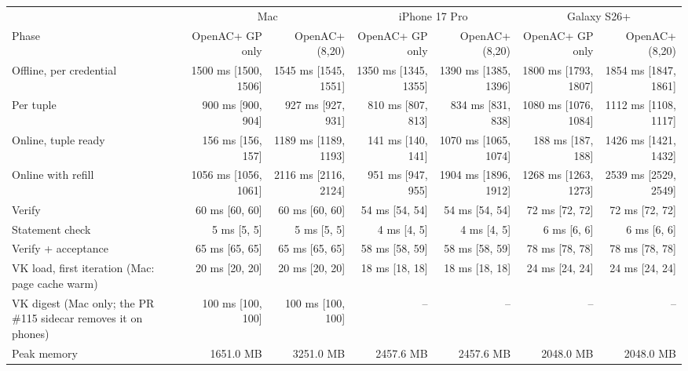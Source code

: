 \begin{tabular}{lrrrrrr}
\toprule
 & \multicolumn{2}{c}{Mac} & \multicolumn{2}{c}{iPhone 17 Pro} & \multicolumn{2}{c}{Galaxy S26+} \\
\cmidrule(lr){2-3}\cmidrule(lr){4-5}\cmidrule(lr){6-7}
Phase & OpenAC+ GP only & OpenAC+ (8,20) & OpenAC+ GP only & OpenAC+ (8,20) & OpenAC+ GP only & OpenAC+ (8,20) \\
\midrule
Offline, per credential & 1500 ms [1500, 1506] & 1545 ms [1545, 1551] & 1350 ms [1345, 1355] & 1390 ms [1385, 1396] & 1800 ms [1793, 1807] & 1854 ms [1847, 1861] \\
Per tuple & 900 ms [900, 904] & 927 ms [927, 931] & 810 ms [807, 813] & 834 ms [831, 838] & 1080 ms [1076, 1084] & 1112 ms [1108, 1117] \\
Online, tuple ready & 156 ms [156, 157] & 1189 ms [1189, 1193] & 141 ms [140, 141] & 1070 ms [1065, 1074] & 188 ms [187, 188] & 1426 ms [1421, 1432] \\
Online with refill & 1056 ms [1056, 1061] & 2116 ms [2116, 2124] & 951 ms [947, 955] & 1904 ms [1896, 1912] & 1268 ms [1263, 1273] & 2539 ms [2529, 2549] \\
Verify & 60 ms [60, 60] & 60 ms [60, 60] & 54 ms [54, 54] & 54 ms [54, 54] & 72 ms [72, 72] & 72 ms [72, 72] \\
Statement check & 5 ms [5, 5] & 5 ms [5, 5] & 4 ms [4, 5] & 4 ms [4, 5] & 6 ms [6, 6] & 6 ms [6, 6] \\
Verify + acceptance & 65 ms [65, 65] & 65 ms [65, 65] & 58 ms [58, 59] & 58 ms [58, 59] & 78 ms [78, 78] & 78 ms [78, 78] \\
VK load, first iteration (Mac: page cache warm) & 20 ms [20, 20] & 20 ms [20, 20] & 18 ms [18, 18] & 18 ms [18, 18] & 24 ms [24, 24] & 24 ms [24, 24] \\
VK digest (Mac only; the PR \#115 sidecar removes it on phones) & 100 ms [100, 100] & 100 ms [100, 100] & -- & -- & -- & -- \\
Peak memory & 1651.0 MB & 3251.0 MB & 2457.6 MB & 2457.6 MB & 2048.0 MB & 2048.0 MB \\
\bottomrule
\end{tabular}
